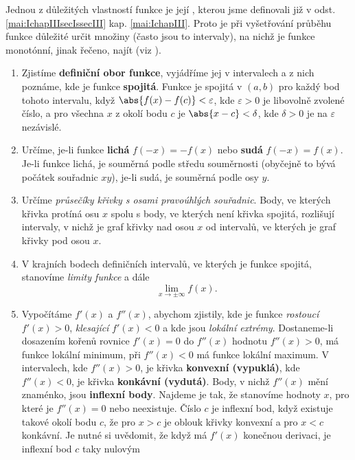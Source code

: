   Jednou z důležitých vlastností funkce je její , kterou jsme definovali již v odst.
  \ref{mai:IchapIIIsecIssecIII} kap. \ref{mai:IchapIII}. Proto je při vyšetřování průběhu
  funkce důležité určit množiny (často jsou to intervaly), na nichž je funkce monotónní, jinak
  řečeno, najít  (viz
  \cite[s.~208]{Brabec1989}). 
    \begin{enumerate}[noitemsep]
      \item Zjistíme \textbf{definiční obor funkce}, vyjádříme jej v intervalech a z nich poznáme,
        kde je funkce \textbf{spojitá}. Funkce je spojitá v $(a,b)$ pro každý bod tohoto intervalu,
        když $\abs{f(x)-f(c)}<\varepsilon$, kde $\varepsilon>0$ je libovolně zvolené číslo, a pro
        všechna \(x\) z okolí bodu $c$ je $\abs{x-c}<\delta$, kde $\delta>0$ je na $\varepsilon$
        nezávislé.
      \item Určíme, je-li funkce \textbf{lichá} $f(-x)=-f(x)$ nebo \textbf{sudá} $f(-x)=f(x)$. Je-li
        funkce lichá, je souměrná podle středu souměrnosti (obyčejně to bývá počátek souřadnic
        $xy$), je-li sudá, je souměrná podle osy \(y\).
      \item Určíme \emph{průsečíky křivky s osami pravoúhlých souřadnic}. Body, ve kte\-rých křivka
        protíná osu \(x\) spolu s body, ve kte\-rých není křivka spojitá, rozlišují intervaly, v nichž
        je graf křivky nad osou \(x\) od intervalů, ve kterých je graf křivky pod osou \(x\).
      \item V krajních bodech definičních intervalů, ve kterých je funkce spojitá, stano\-víme
      \emph{limity funkce} a dále $$\lim_{x \to \pm \infty}f(x).$$
      \item Vypočítáme $f'(x)$ a $f''(x)$, abychom zjistily, kde je funkce \emph{rostoucí}     
        $f'(x)>0$, \emph{klesající} $f'(x)<0$ a kde jsou \emph{lokální extrémy}. Dostaneme-li
        dosazením kořenů rovnice $f'(x)=0$ do $f''(x)$ hodnotu $f''(x)>0$, má funkce lokální
        minimum, při $f''(x)<0$ má funkce lokální maximum. V intervalech, kde $f''(x)>0$, je křivka
        \textbf{konvexní (vypuklá)}, kde $f''(x)<0$, je křivka \textbf{konkávní (vydutá)}. Body, v
        nichž $f''(x)$ mění znaménko, jsou \textbf{inflexní body}. Najdeme je tak, že stanovíme
        hodnoty \(x\), pro které je $f''(x)=0$ nebo neexistuje. Číslo $c$ je inflexní bod, když
        existuje takové okolí bodu $c$, že pro $x>c$ je oblouk křivky konvexní a pro $x<c$ konkávní.
        Je nutné si uvědomit, že když má $f'(x)$ konečnou derivaci, je inflexní bod $c$ taky nulovým

\end{enumerate}
